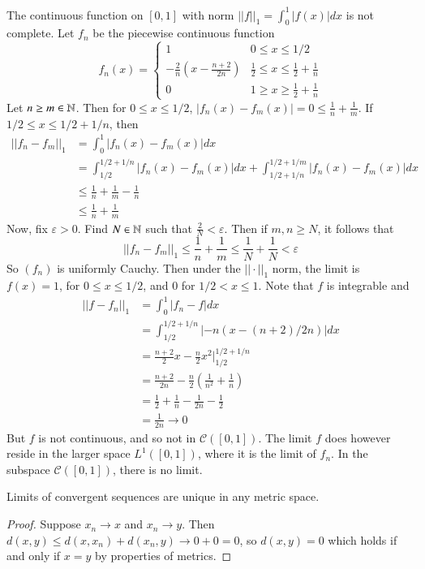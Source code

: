 \begin{example}
    The continuous function on $[0,1]$ with norm $||f||_1 = \int_0^1|f(x)|dx$ is not complete. Let $f_n$ be the piecewise continuous function $$f_n(x) = \left\{\begin{array}{cc} 1 & 0 \leq x \leq 1/2 \\ -\frac{2}{n}\left(x-\frac{n+2}{2n}\right) & \frac{1}{2} \leq x \leq \frac{1}{2}+\frac{1}{n} \\ 0& 1\geq x \geq \frac{1}{2}+\frac{1}{n} \end{array}\right.$$ Let $n\geq m \in \mathbb N$. Then for $0 \leq x \leq 1/2$, $|f_n(x)-f_m(x)| = 0 \leq \frac{1}{n}+\frac{1}{m}$. If $1/2\leq x \leq 1/2+1/n$, then \begin{align*}
        ||f_n - f_m||_1 &= \int_0^1|f_n(x) - f_m(x)|dx \\
        &= \int_{1/2}^{1/2+1/n}|f_n(x)-f_m(x)|dx + \int_{1/2+1/n}^{1/2+1/m}|f_n(x)-f_m(x)|dx \\
        &\leq \frac{1}{n} + \frac{1}{m} - \frac{1}{n} \\
        &\leq \frac{1}{n} + \frac{1}{m}
    \end{align*}
    Now, fix $\varepsilon > 0$. Find $N \in \mathbb N$ such that $\frac{2}{N} < \varepsilon$. Then if $m,n \geq N$, it follows that $$||f_n - f_m||_1 \leq \frac{1}{n} + \frac{1}{m} \leq \frac{1}{N} + \frac{1}{N} < \varepsilon$$ So $(f_n)$ is uniformly Cauchy. Then under the $||\cdot||_1$ norm, the limit is $f(x) = 1$, for $0 \leq x \leq 1/2$, and $0$ for $1/2 < x \leq 1$. Note that $f$ is integrable and \begin{align*}
        ||f-f_n||_1 &= \int_0^1|f_n-f|dx\\
        &= \int_{1/2}^{1/2+1/n}|-n(x-(n+2)/2n)|dx \\
        &= \frac{n+2}{2}x-\frac{n}{2}x^2\vert_{1/2}^{1/2+1/n} \\
        &= \frac{n+2}{2n}-\frac{n}{2}\left(\frac{1}{n^2}+\frac{1}{n}\right) \\
        &= \frac{1}{2}+\frac{1}{n} - \frac{1}{2n} - \frac{1}{2} \\
        &= \frac{1}{2n}\rightarrow 0
    \end{align*}
    But $f$ is not continuous, and so not in $\mathcal{C}([0,1])$. The limit $f$ does however reside in the larger space $L^1([0,1])$, where it is the limit of $f_n$. In the subspace $\mathcal{C}([0,1])$, there is no limit.
\end{example}

\begin{proposition}
    Limits of convergent sequences are unique in any metric space.
\end{proposition}
\begin{proof}
    Suppose $x_n\rightarrow x$ and $x_n \rightarrow y$. Then $d(x,y) \leq d(x,x_n)+d(x_n,y)\rightarrow 0+0 = 0$, so $d(x,y) = 0$ which holds if and only if $x=y$ by properties of metrics.
\end{proof}



